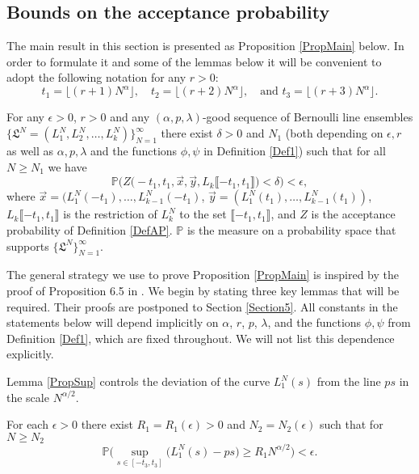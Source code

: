\subsection{Bounds on the acceptance probability}\label{Section4.1}
 The main result in this section is presented as Proposition \ref{PropMain} below. In order to formulate it and some of the lemmas below it will be convenient to adopt the following notation for any $r > 0$:
\begin{equation}\label{eqsts}
t_1 =\lfloor (r+1) N^{\alpha} \rfloor,\quad t_2 = \lfloor (r+2)N^{\alpha} \rfloor,\quad \textrm{and } t_3 = \lfloor (r+3)N^{\alpha} \rfloor.
\end{equation}
\begin{proposition}\label{PropMain} For any $\epsilon > 0$, $r > 0$ and any $(\alpha,p,\lambda)$-good sequence of Bernoulli line ensembles $\big\{ \mathfrak{L}^N  = (L^N_1,L^N_2, \dots, L^N_k)\big\}_{N=1}^{\infty}$
there exist $\delta > 0$ and $N_1$ (both depending on $\epsilon, r$ as well as $ \alpha, p, \lambda$ and the functions $\phi, \psi$ in Definition \ref{Def1}) such that for all $N \geq N_1$
we have 
$$\mathbb{P}\Big(Z\big( -t_1, t_1, \vec{x}, \vec{y} , L_{k}\llbracket -t_1, t_1\rrbracket\big) < \delta\Big) < \epsilon,$$
where $\vec{x} = (L_1^N(-t_1), \dots, L_{k-1}^N(-t_1)$, $\vec{y} = (L_1^N(t_1), \dots, L^N_{k-1}(t_1))$,  $ L_{k}\llbracket -t_1, t_1\rrbracket$ is the restriction of $L^N_k$ to the set $\llbracket -t_1, t_1\rrbracket$, and $Z$ is the acceptance probability of Definition \ref{DefAP}. $\mathbb{P}$ is the measure on a probability space that supports $\big\{ \mathfrak{L}^N \big\}_{N = 1}^\infty$.
\end{proposition}

The general strategy we use to prove Proposition \ref{PropMain} is inspired by the proof of Proposition 6.5 in \cite{CorHamK}. We begin by stating three key lemmas that will be required. Their proofs are postponed to Section \ref{Section5}. All constants in the statements below will depend implicitly on $\alpha$, $r$, $p$, $\lambda$, and the functions $\phi, \psi$ from Definition \ref{Def1}, which are fixed throughout. We will not list this dependence explicitly.

Lemma \ref{PropSup} controls the deviation of the curve $L^N_1(s)$ from the line $ps$ in the scale $N^{\alpha/2}$.
\begin{lemma}\label{PropSup} For each $\epsilon > 0$ there exist $R_1=R_1(\epsilon) > 0$ and $N_2= N_2(\epsilon)$ such that for $N \geq N_2$ 
$$\mathbb{P}\Big( \sup_{s \in [ -t_3, t_3] }\big( L^N_1(s) - p s \big) \geq  R_1N^{\alpha/2} \Big) < \epsilon.$$
\end{lemma}

